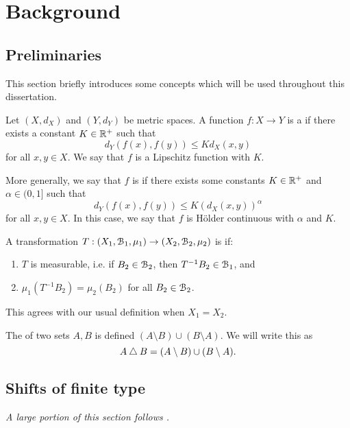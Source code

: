 \chapter{Background}
\section{Preliminaries}
This section briefly introduces some concepts which will be used throughout this dissertation.

\begin{definition}
	Let $(X, d_X)$ and $(Y, d_Y)$ be metric spaces. A function $f : X \to Y$ is a  if there exists a constant $K \in \mathbb{R}^+$ such that
	\[
		d_Y(f(x), f(y)) \leq Kd_X(x, y)
	\]
	for all $x, y \in X$. We say that $f$ is a Lipschitz function with  $K$.~\cite[p154]{searcoid:metric-spaces}
	
	More generally, we say that $f$ is  if there exists some constants $K \in \mathbb{R}^+$ and $\alpha \in (0, 1]$ such that
	\[
	d_Y(f(x), f(y)) \leq K(d_X(x, y))^\alpha
	\]
	for all $x, y \in X$. In this case, we say that $f$ is H\"older continuous with  $\alpha$ and  $K$.~\cite[p143]{brin-stuck:dynsys}
\end{definition}

\begin{definition}
	A transformation $T : (X_1, \mathcal{B}_1, \mu_1) \to (X_2, \mathcal{B}_2, \mu_2)$ is  if:
	\begin{enumerate}
		\item $T$ is measurable, i.e. if $B_2 \in \mathcal{B}_2$, then $T^{-1}{B_2} \in \mathcal{B}_1$, and
		\item $\mu_1(T^{-1}{B_2}) = \mu_2(B_2)$ for all $B_2 \in \mathcal{B}_2$.
	\end{enumerate}
	This agrees with our usual definition when $X_1 = X_2$.
\end{definition}

\begin{definition}
	The  of two sets $A, B$ is defined $(A \setminus B) \cup (B \setminus A)$. We will write this as
	\begin{equation*}
		A \bigtriangleup B = (A \setminus B) \cup (B \setminus A).
	\end{equation*}
\end{definition}

\section{Shifts of finite type}
\emph{A large portion of this section follows \cite[Chapter 1]{parry-pollicott:zeta-fns-periodic-orbits}.}
